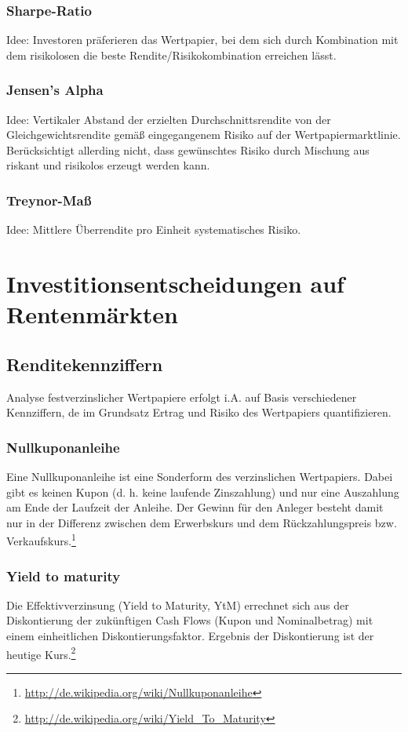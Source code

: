 \subsubsection{Sharpe-Ratio}
Idee: Investoren präferieren das Wertpapier, bei dem sich durch Kombination mit dem risikolosen die beste Rendite/Risikokombination erreichen lässt.

\subsubsection{Jensen's Alpha}
Idee: Vertikaler Abstand der erzielten Durchschnittsrendite von der Gleichgewichtsrendite gemäß eingegangenem Risiko auf der Wertpapiermarktlinie.
Berücksichtigt allerding nicht, dass gewünschtes Risiko durch Mischung aus riskant und risikolos erzeugt werden kann.

\subsubsection{Treynor-Maß}
Idee: Mittlere Überrendite pro Einheit systematisches Risiko.



\section{Investitionsentscheidungen auf Rentenmärkten}

\subsection{Renditekennziffern}
Analyse festverzinslicher Wertpapiere erfolgt i.A. auf Basis verschiedener Kennziffern, de im Grundsatz Ertrag und Risiko des Wertpapiers quantifizieren.

\subsubsection{Nullkuponanleihe}
Eine Nullkuponanleihe  ist eine Sonderform des verzinslichen Wertpapiers. Dabei gibt es keinen Kupon (d. h. keine laufende Zinszahlung) und nur eine Auszahlung am Ende der Laufzeit der Anleihe. Der Gewinn für den Anleger besteht damit nur in der Differenz zwischen dem Erwerbskurs und dem Rückzahlungspreis bzw. Verkaufskurs.\footnote{\url{http://de.wikipedia.org/wiki/Nullkuponanleihe}}

\subsubsection{Yield to maturity}
Die Effektivverzinsung (Yield to Maturity, YtM) errechnet sich aus der Diskontierung der zukünftigen Cash Flows (Kupon und Nominalbetrag) mit einem einheitlichen Diskontierungsfaktor. Ergebnis der Diskontierung ist der heutige Kurs.\footnote{\url{http://de.wikipedia.org/wiki/Yield_To_Maturity}}

